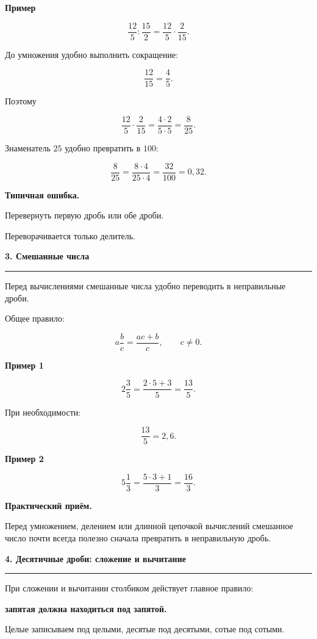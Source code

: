 \documentclass[a4paper,12pt]{article}
\newcommand{\topic}[1]{%
    \par\vspace{0.9em}%
    {\Large\bfseries\color{darkaccent}#1}\par
    \vspace{0.25em}
    \noindent
    \color{accent}\rule{\linewidth}{0.6pt}
    \color{black}
    \vspace{0.55em}
}
\newcommand{\subtopic}[1]{%
    \par\vspace{0.55em}%
    {\large\bfseries\color{textgray}#1}\par
    \vspace{0.2em}
}
\newcommand{\important}[1]{%
    \textbf{\color{darkaccent}#1}%
}
\begin{document}
\subtopic{Пример}

\[
\frac{12}{5}:\frac{15}{2}
=
\frac{12}{5}\cdot\frac{2}{15}.
\]

До умножения удобно выполнить сокращение:

\[
\frac{12}{15}=\frac45.
\]

Поэтому

\[
\frac{12}{5}\cdot\frac{2}{15}
=
\frac{4\cdot2}{5\cdot5}
=
\frac{8}{25}.
\]

Знаменатель $25$ удобно превратить в $100$:

\[
\frac{8}{25}
=
\frac{8\cdot4}{25\cdot4}
=
\frac{32}{100}
=
0{,}32.
\]

\important{Типичная ошибка.}
Перевернуть первую дробь или обе дроби.

Переворачивается только делитель.


\topic{3. Смешанные числа}

Перед вычислениями смешанные числа удобно переводить
в неправильные дроби.

Общее правило:

\[
a\frac{b}{c}
=
\frac{ac+b}{c},
\qquad
c\ne0.
\]

\subtopic{Пример 1}

\[
2\frac35
=
\frac{2\cdot5+3}{5}
=
\frac{13}{5}.
\]

При необходимости:

\[
\frac{13}{5}=2{,}6.
\]

\subtopic{Пример 2}

\[
5\frac13
=
\frac{5\cdot3+1}{3}
=
\frac{16}{3}.
\]

\important{Практический приём.}
Перед умножением, делением или длинной цепочкой вычислений
смешанное число почти всегда полезно сначала превратить
в неправильную дробь.


\topic{4. Десятичные дроби: сложение и вычитание}

При сложении и вычитании столбиком действует главное правило:

\begin{center}
\important{запятая должна находиться под запятой.}
\end{center}

Целые записываем под целыми, десятые под десятыми,
сотые под сотыми.
\end{document}

